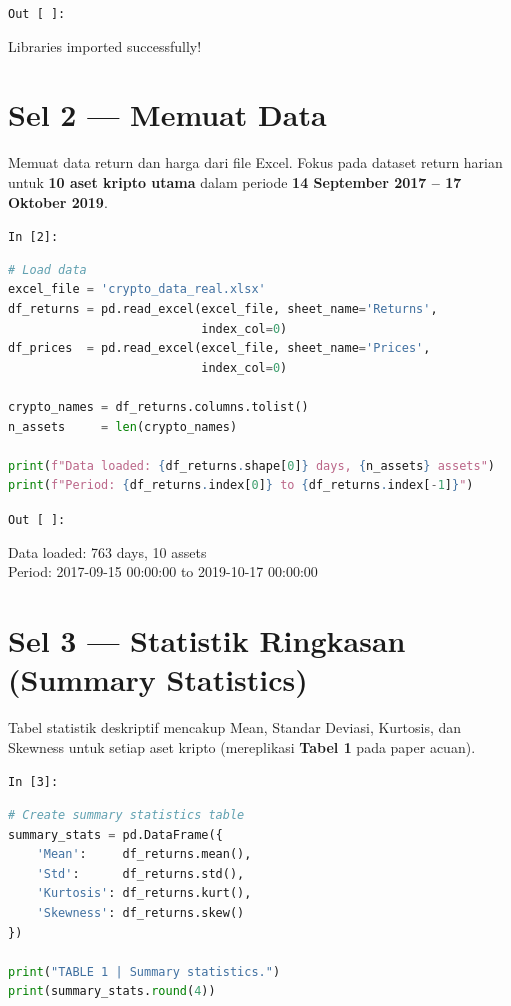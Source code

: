 \documentclass[12pt,a4paper]{article}
\newcommand{\cellIn}[1]{%
  \begin{tcolorbox}[cellheader]
    \texttt{In [#1]:}
  \end{tcolorbox}\vspace{-6pt}%
}
\newcommand{\cellOut}{%
  \vspace{-4pt}%
  \begin{tcolorbox}[cellheader, colback=outputbg, colframe=outputframe, fontupper=\sffamily\small\bfseries\color{outputframe!80!black}]
    \texttt{Out [ ]:}
  \end{tcolorbox}\vspace{-6pt}%
}
\begin{document}
\cellOut
\begin{tcolorbox}[outputbox]
Libraries imported successfully!
\end{tcolorbox}

\section{Sel 2 --- Memuat Data}

Memuat data return dan harga dari file Excel. Fokus pada dataset return harian
untuk \textbf{10 aset kripto utama} dalam periode
\textbf{14 September 2017 -- 17 Oktober 2019}.

\cellIn{2}
\begin{tcolorbox}[codebox]
\begin{lstlisting}[language=Python, numbers=none]
# Load data
excel_file = 'crypto_data_real.xlsx'
df_returns = pd.read_excel(excel_file, sheet_name='Returns',
                           index_col=0)
df_prices  = pd.read_excel(excel_file, sheet_name='Prices',
                           index_col=0)

crypto_names = df_returns.columns.tolist()
n_assets     = len(crypto_names)

print(f"Data loaded: {df_returns.shape[0]} days, {n_assets} assets")
print(f"Period: {df_returns.index[0]} to {df_returns.index[-1]}")
\end{lstlisting}
\end{tcolorbox}

\cellOut
\begin{tcolorbox}[outputbox]
Data loaded: 763 days, 10 assets\\
Period: 2017-09-15 00:00:00 to 2019-10-17 00:00:00
\end{tcolorbox}

\section{Sel 3 --- Statistik Ringkasan (Summary Statistics)}

Tabel statistik deskriptif mencakup Mean, Standar Deviasi, Kurtosis, dan
Skewness untuk setiap aset kripto (mereplikasi \textbf{Tabel 1} pada paper acuan).

\cellIn{3}
\begin{tcolorbox}[codebox]
\begin{lstlisting}[language=Python, numbers=none]
# Create summary statistics table
summary_stats = pd.DataFrame({
    'Mean':     df_returns.mean(),
    'Std':      df_returns.std(),
    'Kurtosis': df_returns.kurt(),
    'Skewness': df_returns.skew()
})

print("TABLE 1 | Summary statistics.")
print(summary_stats.round(4))
\end{lstlisting}
\end{tcolorbox}
\end{document}
